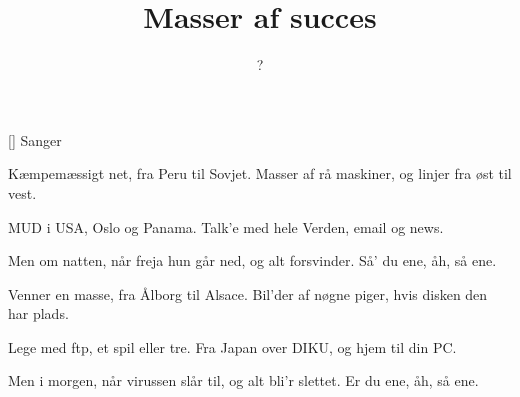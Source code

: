 \documentclass[a4paper,11pt]{article}
\title{Masser af succes}
\author{?}
\begin{document}
\maketitle

\begin{roles}
[] Sanger
\end{roles}


\begin{song}
%
Kæmpemæssigt net,
fra Peru til Sovjet.
Masser af rå maskiner,
og linjer fra øst til vest.

MUD i USA,
Oslo og Panama.
Talk'e med hele Verden,
email og news.

Men om natten,
når freja hun går ned,
og alt forsvinder.
Så' du ene,
åh, så ene.

Venner en masse,
fra Ålborg til Alsace.
Bil'der af nøgne piger,
hvis disken den har plads.

Lege med ftp,
et spil eller tre.
Fra Japan over DIKU,
og hjem til din PC.

Men i morgen,
når virussen slår til,
og alt bli'r slettet.
Er du ene,
åh, så ene.
\end{song}
\end{document}
